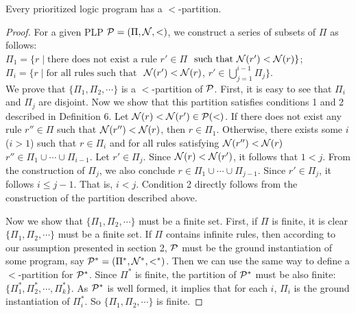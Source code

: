 \documentclass{tlp}
\begin{document}
\begin{theorem}
Every prioritized logic program has a $<$-partition.
\end{theorem}

\noindent
\begin{proof}
For a given PLP ${\cal P}=(\Pi,{\cal N},<)$,
we construct a series of subsets of $\Pi$ as follows:\\
\hspace*{.1in} $\Pi_{1}=\{r\mid \mbox{there does not exist a rule } r'\in \Pi$
$\mbox{ such that } {\cal N}(r')<{\cal N}(r)\}$;\\
\hspace*{.1in} $\Pi_{i}=\{r\mid \mbox{for all rules such that }$
${\cal N}(r')<{\cal N}(r)$, $r'\in \bigcup_{j=1}^{i-1}\Pi_{j}\}$.\\
We prove that $\{\Pi_{1},\Pi_{2},\cdots\}$ is a
$<$-partition of ${\cal P}$.
First, it is easy to see that $\Pi_{i}$ and $\Pi_{j}$ are disjoint.
Now we show that this partition satisfies conditions 1 and 2 described in
Definition 6. Let ${\cal N}(r)<{\cal N}(r')\in {\cal P}(<)$. If
there does not exist any rule $r''\in \Pi$ such that
${\cal N}(r'')<{\cal N}(r)$, then $r\in\Pi_{1}$. Otherwise, there exists some
$i$ ($i>1$) such that $r\in \Pi_{i}$ and for all rules satisfying
${\cal N}(r'')<{\cal N}(r)$ $r''\in \Pi_{1}\cup\cdots\cup\Pi_{i-1}$.
Let $r'\in \Pi_{j}$. Since ${\cal N}(r)<{\cal N}(r')$, it follows that $1<j$.
From the construction of $\Pi_{j}$, we also conclude
$r\in \Pi_{1}\cup\cdots\cup\Pi_{j-1}$. Since $r'\in \Pi_{j}$,
it follows $i\leq j-1$. That is, $i<j$.
Condition 2 directly follows
from the construction of the partition described above.

Now we show that $\{\Pi_{1},\Pi_{2}, \cdots\}$ must be a finite set.
First, if $\Pi$ is finite, it is clear
$\{\Pi_{1},\Pi_{2}, \cdots\}$ must be a finite set.
If $\Pi$ contains infinite rules, then according to our assumption presented in
section 2,
${\cal P}$ must be the ground instantiation of some program, say
${\cal P}^{*}=(\Pi^{*}, {\cal N}^{*}, <^{*})$.
Then we can use the same way to define
a $<$-partition for ${\cal P}^{*}$. Since
$\Pi^{*}$ is finite, the partition of ${\cal P}^{*}$ must be
also finite: $\{\Pi_{1}^{*}, \Pi_{2}^{*}, \cdots, \Pi_{k}^{*}\}$.
As ${\cal P}^{*}$ is well formed, it implies that for each $i$,
$\Pi_{i}$ is the ground instantiation of $\Pi_{i}^{*}$. So
$\{\Pi_{1},\Pi_{2},\cdots\}$ is finite.
\end{proof}
\end{document}
